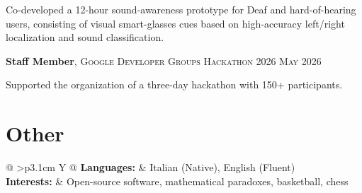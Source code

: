 \documentclass[a4paper,11pt]{extarticle}
\newcommand{\cvdetail}{\fontsize{11pt}{14pt}\selectfont}
\newcommand{\cvdate}[1]{%
    {\fontsize{9pt}{10.5pt}\selectfont\textsc{#1}}%
}
\begin{document}
{\cvdetail
Co-developed a 12-hour sound-awareness prototype for Deaf and hard-of-hearing users,
consisting of visual smart-glasses cues based on high-accuracy left/right localization and sound classification.
\par}

\vspace{1pt}

\textbf{Staff Member},
\textsc{Google Developer Groups Hackathon 2026}
\hfill
\cvdate{May 2026}

{\cvdetail
Supported the organization of a three-day hackathon with 150+ participants.
\par}


\section{Other}

{\cvdetail
\begin{tabularx}{\linewidth}{
    @{}
    >{\raggedleft\arraybackslash}p{3.1cm}
    Y
    @{}
}
\textbf{Languages:}
    & Italian (Native), English (Fluent) \\[2pt]

\textbf{Interests:}
    & Open-source software, mathematical paradoxes, basketball, chess
\end{tabularx}
}
\end{document}
